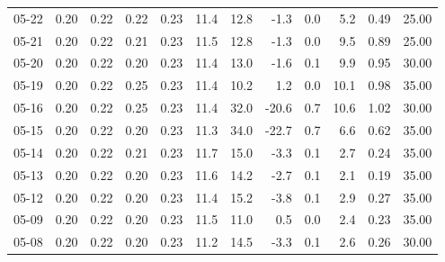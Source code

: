 \begin{threeparttable}
{\begin{tabular}{lrrrrrrrrrrr}
  05-22 &          0.20 &          0.22 &          0.22 &        0.23 &                11.4 &                12.8 &       -1.3 &                 0.0 &              5.2 &            0.49 &                  25.00 \\
  05-21 &          0.20 &          0.22 &          0.21 &        0.23 &                11.5 &                12.8 &       -1.3 &                 0.0 &              9.5 &            0.89 &                  25.00 \\
  05-20 &          0.20 &          0.22 &          0.20 &        0.23 &                11.4 &                13.0 &       -1.6 &                 0.1 &              9.9 &            0.95 &                  30.00 \\
  05-19 &          0.20 &          0.22 &          0.25 &        0.23 &                11.4 &                10.2 &        1.2 &                 0.0 &             10.1 &            0.98 &                  35.00 \\
  05-16 &          0.20 &          0.22 &          0.25 &        0.23 &                11.4 &                32.0 &      -20.6 &                 0.7 &             10.6 &            1.02 &                  30.00 \\
  05-15 &          0.20 &          0.22 &          0.20 &        0.23 &                11.3 &                34.0 &      -22.7 &                 0.7 &              6.6 &            0.62 &                  35.00 \\
  05-14 &          0.20 &          0.22 &          0.21 &        0.23 &                11.7 &                15.0 &       -3.3 &                 0.1 &              2.7 &            0.24 &                  35.00 \\
  05-13 &          0.20 &          0.22 &          0.20 &        0.23 &                11.6 &                14.2 &       -2.7 &                 0.1 &              2.1 &            0.19 &                  35.00 \\
  05-12 &          0.20 &          0.22 &          0.20 &        0.23 &                11.4 &                15.2 &       -3.8 &                 0.1 &              2.9 &            0.27 &                  35.00 \\
  05-09 &          0.20 &          0.22 &          0.20 &        0.23 &                11.5 &                11.0 &        0.5 &                 0.0 &              2.4 &            0.23 &                  35.00 \\
  05-08 &          0.20 &          0.22 &          0.20 &        0.23 &                11.2 &                14.5 &       -3.3 &                 0.1 &              2.6 &            0.26 &                  30.00 \\

\end{tabular}}
\end{threeparttable}
